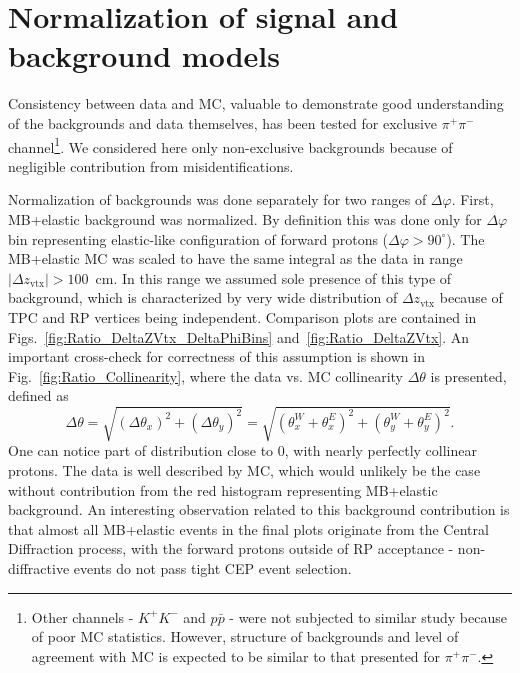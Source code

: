 \section{Normalization of signal and background models}\label{sec:bkgdSignalNorm}


Consistency between data and MC, valuable to demonstrate good understanding of the backgrounds and data themselves, has been tested for exclusive $\pi^{+}\pi^{-}$ channel\footnote{Other channels - $K^{+}K^{-}$ and $p\bar{p}$ - were not subjected to similar study because of poor MC statistics. However, structure of backgrounds and level of agreement with MC is expected to be similar to that presented for $\pi^{+}\pi^{-}$.}. We considered here only non-exclusive backgrounds because of negligible contribution from misidentifications.

Normalization of backgrounds was done separately for two ranges of $\Delta\varphi$. First, MB+elastic background was normalized. By definition this was done only for $\Delta\varphi$ bin representing elastic-like configuration of forward protons ($\Delta\varphi>90^{\circ}$). The MB+elastic MC was scaled to have the same integral as the data in range $|\Delta z_{\text{vtx}}|>100$~cm. In this range we assumed sole presence of this type of background, which is characterized by very wide distribution of $\Delta z_{\text{vtx}}$ because of TPC and RP vertices being independent. Comparison plots are contained in Figs.~\ref{fig:Ratio_DeltaZVtx_DeltaPhiBins} and~\ref{fig:Ratio_DeltaZVtx}. An important cross-check for correctness of this assumption is shown in Fig.~\ref{fig:Ratio_Collinearity}, where the data vs. MC collinearity $\Delta\theta$ is presented, defined as%
%
\begin{equation}\label{eq:collinearity}%
 \Delta\theta = \sqrt{\left(\Delta\theta_{x}\right)^{2} + \left(\Delta\theta_{y}\right)^{2}} = \sqrt{\left(\theta_{x}^{W}+\theta_{x}^{E}\right)^{2} + \left(\theta_{y}^{W}+\theta_{y}^{E}\right)^{2}}.
\end{equation}
%
One can notice part of distribution close to 0, with nearly perfectly collinear protons. The data is well described by MC, which would unlikely be the case without contribution from the red histogram representing MB+elastic background. An interesting observation related to this background contribution is that almost all MB+elastic events in the final plots originate from the Central Diffraction process, with the forward protons outside of RP acceptance - non-diffractive events do not pass tight CEP event selection.

